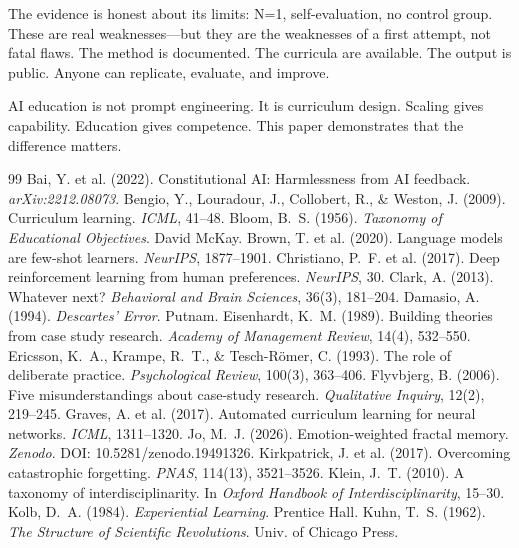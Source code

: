 \documentclass[11pt,a4paper]{article}
\begin{document}
The evidence is honest about its limits: N=1, self-evaluation, no control group. These are real weaknesses---but they are the weaknesses of a first attempt, not fatal flaws. The method is documented. The curricula are available. The output is public. Anyone can replicate, evaluate, and improve.

AI education is not prompt engineering. It is curriculum design. Scaling gives capability. Education gives competence. This paper demonstrates that the difference matters.

\begin{thebibliography}{99}
 Bai, Y. et al. (2022). Constitutional AI: Harmlessness from AI feedback. \emph{arXiv:2212.08073}.
 Bengio, Y., Louradour, J., Collobert, R., \& Weston, J. (2009). Curriculum learning. \emph{ICML}, 41--48.
 Bloom, B.~S. (1956). \emph{Taxonomy of Educational Objectives}. David McKay.
 Brown, T. et al. (2020). Language models are few-shot learners. \emph{NeurIPS}, 1877--1901.
 Christiano, P.~F. et al. (2017). Deep reinforcement learning from human preferences. \emph{NeurIPS}, 30.
 Clark, A. (2013). Whatever next? \emph{Behavioral and Brain Sciences}, 36(3), 181--204.
 Damasio, A. (1994). \emph{Descartes' Error}. Putnam.
 Eisenhardt, K.~M. (1989). Building theories from case study research. \emph{Academy of Management Review}, 14(4), 532--550.
 Ericsson, K.~A., Krampe, R.~T., \& Tesch-R\"{o}mer, C. (1993). The role of deliberate practice. \emph{Psychological Review}, 100(3), 363--406.
 Flyvbjerg, B. (2006). Five misunderstandings about case-study research. \emph{Qualitative Inquiry}, 12(2), 219--245.
 Graves, A. et al. (2017). Automated curriculum learning for neural networks. \emph{ICML}, 1311--1320.
 Jo, M.~J. (2026). Emotion-weighted fractal memory. \emph{Zenodo}. DOI: 10.5281/zenodo.19491326.
 Kirkpatrick, J. et al. (2017). Overcoming catastrophic forgetting. \emph{PNAS}, 114(13), 3521--3526.
 Klein, J.~T. (2010). A taxonomy of interdisciplinarity. In \emph{Oxford Handbook of Interdisciplinarity}, 15--30.
 Kolb, D.~A. (1984). \emph{Experiential Learning}. Prentice Hall.
 Kuhn, T.~S. (1962). \emph{The Structure of Scientific Revolutions}. Univ. of Chicago Press.

\end{thebibliography}
\end{document}
